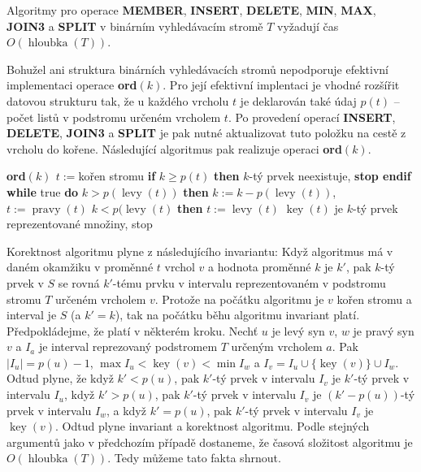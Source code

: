 \documentclass[a4paper,12pt]{article}
\DeclareMathOperator*{\levy}{levy}
\DeclareMathOperator*{\pravy}{pravy}
\DeclareMathOperator*{\key}{key}
\DeclareMathOperator*{\hloubka}{hloubka}
\begin{document}
\begin{veta}Algoritmy pro operace {\bf MEMBER}, {\bf INSERT}, {\bf DE\-LE\-TE}, {\bf MIN}, {\bf MAX}, 
{\bf JOIN3} a {\bf SPLIT} v binár\-ním vy\-hledá\-va\-cím stro\-mě $
T$ vyžadují 
čas $O(\hloubka(T))$. 
\end{veta}

Bohužel ani struktura binárních vyhledávacích 
stromů nepodporuje efektivní implementaci operace 
{\bf ord$(k)$}. Pro její efektivní implentaci je vhodné rozšířit 
datovou strukturu tak, že u každého vrcholu $t$ je deklarován 
také údaj $p(t)$ -- počet listů v podstromu určeném 
vrcholem $t$. Po provedení operací {\bf INSERT}, {\bf DELETE}, {\bf JOIN3} a 
{\bf SPLIT} je pak nutné aktualizovat tuto položku na cestě z 
vrcholu do kořene. Následující algoritmus pak 
realizuje operaci {\bf ord}$(k)$.

{\bf ord$(k)$ \newline 
$t:=$}kořen stromu \newline 
{\bf if} $k\ge p(t)$ {\bf then} $k$-tý prvek neexistuje, {\bf stop endif\newline 
while} true {\bf do}\newline 
\phantom{---}{\bf if} $k>p(\levy(t))$ {\bf then}\newline 
\phantom{------}$k:=k-p(\levy(t))$, $t:=\pravy(t)$\newline 
\phantom{---}{\bf else}\newline 
\phantom{------}{\bf if} $k<p(\levy(t)$ {\bf then}\newline 
\phantom{---------}$t:=\levy(t)$\newline 
\phantom{------}{\bf else}\newline 
\phantom{---------}$\key(t)$ je $k$-tý prvek reprezentované množiny, stop \newline 
\phantom{------}{\bf endif}\newline 
\phantom{---}{\bf endif\newline 
enddo}

Korektnost algoritmu plyne z následujícího invariantu:  
Když algoritmus má v daném okamžiku v proměnné $t$ vrchol $
v$ 
a hodnota proměnné $k$ je $k'$, pak $k$-tý prvek v $S$ se rovná 
$k'$-tému prvku v intervalu reprezentovaném v podstromu 
stromu $T$ určeném vrcholem $v$.  Protože na počátku algoritmu 
je $v$ kořen stromu a interval je $S$ (a $k'=k$), tak na počátku 
běhu algoritmu invariant platí.  Předpokládejme, že platí v 
některém kroku.  Nechť $u$ je levý syn $v$, $w$ je pravý syn $
v$ a 
$I_a$ je interval reprezovaný podstromem $T$ určeným vrcholem $
a$.  
Pak $|I_u|=p(u)-1$, $\max I_u<\key(v)<\min I_w$ a 
$I_v=I_u\cup \{\key(v)\}\cup I_w$.  Odtud plyne, že když $k'
<p(u)$, pak 
$k'$-tý prvek v intervalu $I_v$ je $k'$-tý prvek v intervalu $
I_u$, když 
$k'>p(u)$, pak $k'$-tý prvek v intervalu $I_v$ je $(k'-p(u))$-tý prvek 
v intervalu $I_w$, a když $k'=p(u)$, pak $k'$-tý prvek v intervalu $
I_v$ 
je $\key(v)$.  Odtud plyne invariant a korektnost algoritmu.  
Podle stejných argumentů jako v předchozím případě 
dostaneme, že časová složitost algoritmu je $O(\hloubka
(T))$.  
Tedy můžeme tato fakta shrnout.  
\end{document}
